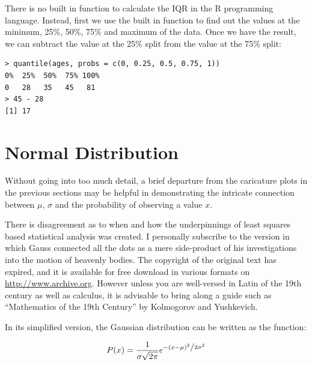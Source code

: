 \documentclass{tufte-book} %
\begin{document}
There is no built in function to calculate the IQR in the R programming language. Instead, first we use the built in function to find out the values at the minimum, 25\%, 50\%, 75\% and maximum of the data. Once we have the result, we can subtract the value at the 25\% split from the value at the 75\% split:

\begin{Verbatim}
> quantile(ages, probs = c(0, 0.25, 0.5, 0.75, 1))
0%  25%  50%  75% 100% 
0   28   35   45   81 
> 45 - 28
[1] 17
\end{Verbatim}

\section{Normal Distribution}
Without going into too much detail, a brief departure from the caricature plots in the previous sections may be helpful in demonstrating the intricate connection between $\mu$, $\sigma$ and the probability of observing a value $x$. 

There is disagreement as to when and how the underpinnings of least squares based statistical analysis was created. I personally subscribe to the version in which Gauss connected all the dots as a mere side-product of his investigations into the motion of heavenly bodies\cite{gauss1877}. The copyright of the original text has expired, and it is available for free download in various formats on \url{http://www.archive.org}. However unless you are well-versed in Latin of the 19th century as well as calculus, it is advisable to bring along a guide such as ``Mathematics of the 19th Century'' by Kolmogorov and Yushkevich\cite{kolmogorov1992}. 

In its simplified version, the Gaussian distribution can be written as the function:

\begin{equation} \label{formula:normal-distribution}
	P(x) = \frac{1}{{\sigma \sqrt {2\pi } }}
	e^{{{ - \left( {x - \mu } \right)^2 } 
			\mathord{\left/ {\vphantom 
					{{ - \left( {x - \mu } \right)^2 } {2\sigma ^2 }}} 
				\right. \kern-\nulldelimiterspace} {2\sigma ^2 }}}
\end{equation}
\end{document}
